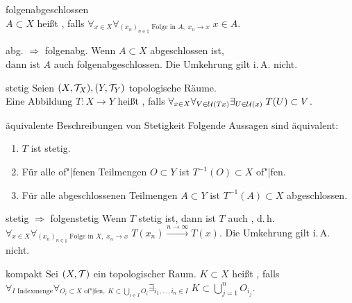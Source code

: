 \begin{Def}{folgenabgeschlossen}\\
    $A \subset X$ heißt , falls
    $\forall_{x \in X} \forall_{(x_n)_{n \in \natural} \text{ Folge in } A,\; x_n \to x}\;
    x \in A$.
\end{Def}

\begin{Satz}{abg. $\Rightarrow$ folgenabg.}
    Wenn $A \subset X$ abgeschlossen ist,\\
    dann ist $A$ auch folgenabgeschlossen.
    Die Umkehrung gilt i.\,A. nicht.
\end{Satz}

\linie

\begin{Def}{stetig}
    Seien $(X, \mathcal{T}_X), (Y, \mathcal{T}_Y)$ topologische Räume.\\
    Eine Abbildung $T\colon X \rightarrow Y$ heißt , falls
    $\forall_{x \in X} \forall_{V \in \mathcal{U}(Tx)} \exists_{U \in \mathcal{U}(x)}\; T(U) \subset V$.
\end{Def}

\begin{Satz}{äquivalente Beschreibungen von Stetigkeit}
    Folgende Aussagen sind äquivalent:
    \begin{enumerate}
        \item
        $T$ ist stetig.
        
        \item
        Für alle of"|fenen Teilmengen $O \subset Y$ ist $T^{-1}(O) \subset X$ of"|fen.
        
        \item
        Für alle abgeschlossenen Teilmengen $A \subset Y$ ist $T^{-1}(A) \subset X$ abgeschlossen.
    \end{enumerate}
\end{Satz}

\begin{Satz}{stetig $\Rightarrow$ folgenstetig}
    Wenn $T$ stetig ist, dann ist $T$ auch , d.\,h.\\
    $\forall_{x \in X}
    \forall_{(x_n)_{n \in \natural} \text{ Folge in } X,\; x_n \to x}\;
    T(x_n) \xrightarrow{n \to \infty} T(x)$.
    Die Umkehrung gilt i.\,A. nicht.
\end{Satz}

\linie

\begin{Def}{kompakt}
    Sei $(X, \mathcal{T})$ ein topologischer Raum.
    $K \subset X$ heißt , falls\\
    $\forall_{I \text{ Indexmenge}} \forall_{O_i \subset X \text{ of"|fen},\;
    K \subset \bigcup_{i \in I} O_i} \exists_{i_1, \dotsc, i_n \in I}\;
    K \subset \bigcup_{j=1}^n O_{i_j}$.
\end{Def}

